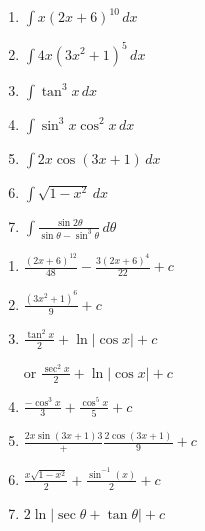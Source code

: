 \documentclass[12pt, letterpaper]{article}
\begin{document}
\Large
\begin{enumerate}[itemsep=5cm]
    \item 
    $\int x(2x+6)^{10}\,dx$

    \item 
    $\int 4x(3x^2+1)^5\,dx$

    \item 
    $\int \tan^3{x}\,dx$

    \item 
    $\int \sin^3{x}\cos^2{x}\,dx$

    \item 
    $\int 2x \cos(3x+1)\,dx$

    \item 
    $\int \sqrt{1-x^2}\, dx$

    \item 
    $\int \frac{\sin{2\theta}}{\sin{\theta}-\sin^3{\theta}}\,d\theta$


\end{enumerate}
\pagebreak
\begin{enumerate}[itemsep=1cm]
    \item 
    $\frac{(2x+6)^12}{48}-\frac{3(2x+6)^4}{22}+c$

    \item 
    $\frac{(3x^2+1)^6}{9}+c$

    \item 
    $\frac{\tan^2{x}}{2}+\ln{|\cos{x}|}+c$

    or $\frac{\sec^2{x}}{2}+\ln{|\cos{x}|}+c$

    \item 
    $\frac{-\cos^3{x}}{3}+\frac{\cos^5{x}}{5}+c$

    \item 
    $\frac{2x\sin{(3x+1)}{3}}+\frac{2\cos{(3x+1)}}{9}+c$

    \item 
    $\frac{x\sqrt{1-x^2}}{2}+\frac{\sin^{-1}{(x)}}{2}+c$

    \item 
    $2\ln{|\sec{\theta}+\tan{\theta}|}+c$


\end{enumerate}
\end{document}
